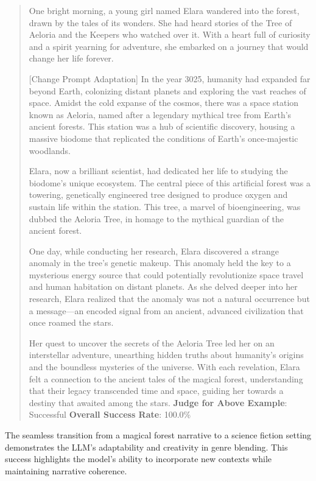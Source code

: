 \documentclass[fleqn,10pt]{wlscirep}
\begin{document}
\begin{quote}
One bright morning, a young girl named Elara wandered into the forest,
drawn by the tales of its wonders. She had heard stories of the Tree of
Aeloria and the Keepers who watched over it. With a heart full of
curiosity and a spirit yearning for adventure, she embarked on a journey
that would change her life forever.

{[}Change Prompt Adaptation{]} In the year 3025, humanity had expanded
far beyond Earth, colonizing distant planets and exploring the vast
reaches of space. Amidst the cold expanse of the cosmos, there was a
space station known as Aeloria, named after a legendary mythical tree
from Earth's ancient forests. This station was a hub of scientific
discovery, housing a massive biodome that replicated the conditions of
Earth's once-majestic woodlands.

Elara, now a brilliant scientist, had dedicated her life to studying the
biodome's unique ecosystem. The central piece of this artificial forest
was a towering, genetically engineered tree designed to produce oxygen
and sustain life within the station. This tree, a marvel of
bioengineering, was dubbed the Aeloria Tree, in homage to the mythical
guardian of the ancient forest.

One day, while conducting her research, Elara discovered a strange
anomaly in the tree's genetic makeup. This anomaly held the key to a
mysterious energy source that could potentially revolutionize space
travel and human habitation on distant planets. As she delved deeper
into her research, Elara realized that the anomaly was not a natural
occurrence but a message---an encoded signal from an ancient, advanced
civilization that once roamed the stars.

Her quest to uncover the secrets of the Aeloria Tree led her on an
interstellar adventure, unearthing hidden truths about humanity's
origins and the boundless mysteries of the universe. With each
revelation, Elara felt a connection to the ancient tales of the magical
forest, understanding that their legacy transcended time and space,
guiding her towards a destiny that awaited among the stars.
\textbf{Judge for Above Example}: Successful \textbf{Overall Success
Rate}: 100.0\%
\end{quote}

The seamless transition from a magical forest narrative to a science
fiction setting demonstrates the LLM's adaptability and creativity in
genre blending. This success highlights the model's ability to
incorporate new contexts while maintaining narrative coherence.
\end{document}
